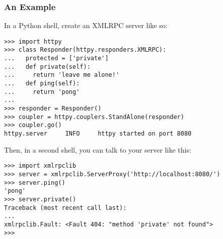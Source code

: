 \subsubsection{An Example}

In a Python shell, create an XMLRPC server like so:

\begin{verbatim}
>>> import httpy
>>> class Responder(httpy.responders.XMLRPC):
...   protected = ['private']
...   def private(self):
...     return 'leave me alone!'
...   def ping(self):
...     return 'pong'
...
>>> responder = Responder()
>>> coupler = httpy.couplers.StandAlone(responder)
>>> coupler.go()
httpy.server     INFO     httpy started on port 8080
\end{verbatim}

Then, in a second shell, you can talk to your server like this:

\begin{verbatim}
>>> import xmlrpclib
>>> server = xmlrpclib.ServerProxy('http://localhost:8080/')
>>> server.ping()
'pong'
>>> server.private()
Traceback (most recent call last):
...
xmlrpclib.Fault: <Fault 404: "method 'private' not found">
>>>
\end{verbatim}
